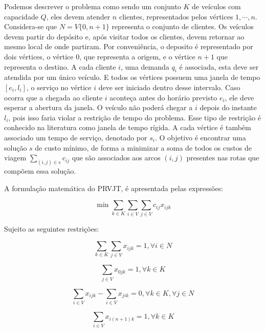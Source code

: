 Podemos descrever o problema como sendo um conjunto \(K\) de veículos com capacidade \(Q\), eles devem atender \(n\) clientes, representados pelos vértices \(1,\cdots,n\). Considera-se que \(N = V \{0, n + 1\}\) representa o conjunto de clientes. Os veículos devem partir do depósito e, após visitar todos os clientes, devem retornar ao mesmo local de onde partiram. Por conveniência, o deposito é representado por dois vértices, o vértice \(0\), que representa a origem, e o vértice \(n+1\) que representa o destino. A cada cliente \(i\), uma demanda \(q_i\) é associada, esta deve ser atendida por um único veículo. E todos os vértices possuem uma janela de tempo \([e_i,l_i]\), o serviço no vértice \(i\) deve ser iniciado dentro desse intervalo. Caso ocorra que a chegada ao cliente \(i\) aconteça antes do horário previsto \(e_i\), ele deve esperar a abertura da janela. O veículo não poderá chegar a \(i\) depois do instante \(l_i\), pois isso faria violar a restrição de tempo do problema. Esse tipo de restrição é conhecido na literatura como janela de tempo rígida. A cada vértice é também associado um tempo de serviço, denotado por \(s_i\). O objetivo é encontrar uma solução \(s\) de custo mínimo, de forma a minimizar a soma de todos os custos de viagem \(\sum_{(i,j) \in s} c_{ij}\) que são associados aos arcos \((i,j)\) presentes nas rotas que compõem essa solução.

A formulação matemática do PRVJT, é apresentada pelas expressões:

\begin{equation}  \label{eq:prvjt1}
\min
 \sum_{k \in K}\sum_{i \in V}\sum_{j \in V} c_{ij}x_{ijk}
\end{equation}

Sujeito as seguintes restrições:

\begin{equation} \label{eq:prvjt2}
\sum_{k \in K}\sum_{j \in V} x_{ijk} = 1, \forall i \in N
\end{equation}

\begin{equation} \label{eq:prvjt3}
\sum_{j \in V} x_{0jk} = 1, \forall k \in K
\end{equation}

\begin{equation} \label{eq:prvjt4}
\sum_{i \in V} x_{ijk} - \sum_{i \in V} x_{jik} = 0, \forall k \in K, \forall j \in N
\end{equation}

\begin{equation} \label{eq:prvjt5}
\sum_{i \in V} x_{i(n+1)k} = 1, \forall k \in K
\end{equation}

